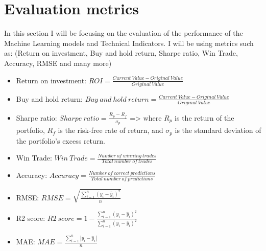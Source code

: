 \documentclass{imc-inf}
\begin{document}
	\section{Evaluation metrics}
	In this section I will be focusing on the evaluation \cite{evaluation_metrics_2} of the performance of the Machine Learning models and Technical Indicators.
	I will be using metrics such as: (Return on investment, Buy and hold return, Sharpe ratio, Win Trade, Accuracy, RMSE and many more)
	\begin{itemize}
		\item Return on investment: $ROI = \frac{Current\ Value - Original\ Value}{Original\ Value}$
		\item Buy and hold return: $Buy\ and\ hold\ return = \frac{Current\ Value - Original\ Value}{Original\ Value}$
		\item Sharpe ratio: $Sharpe\ ratio = \frac{R_p - R_f}{\sigma_p}$ => where $R_p$ is the return of the portfolio, $R_f$ is the risk-free rate of return, and $\sigma_p$ is the standard deviation of the portfolio's excess return.
		\item Win Trade: $Win\ Trade = \frac{Number\ of\ winning\ trades}{Total\ number\ of\ trades}$
		\item Accuracy: $Accuracy = \frac{Number\ of\ correct\ predictions}{Total\ number\ of\ predictions}$
		\item RMSE: $RMSE = \sqrt{\frac{\sum_{i=1}^{n} (y_i - \hat{y}_i)^2}{n}}$
		\item R2 score: $R2\ score = 1 - \frac{\sum_{i=1}^{n} (y_i - \hat{y}_i)^2}{\sum_{i=1}^{n} (y_i - \bar{y}_i)^2}$
		\item MAE: $MAE = \frac{\sum_{i=1}^{n} |y_i - \hat{y}_i|}{n}$
	\end{itemize}
	
\end{document}
